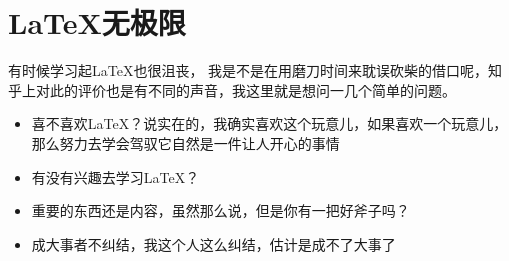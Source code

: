 \chapter{\LaTeX 无极限}

有时候学习起\LaTeX 也很沮丧， 我是不是在用磨刀时间来耽误砍柴的借口呢，知乎上对此的评价也是有不同的声音，我这里就是想问一几个简单的问题。
\begin{itemize}
\item 喜不喜欢\LaTeX ？说实在的，我确实喜欢这个玩意儿，如果喜欢一个玩意儿，那么努力去学会驾驭它自然是一件让人开心的事情
\item 有没有兴趣去学习\LaTeX ？
\item 重要的东西还是内容，虽然那么说，但是你有一把好斧子吗？
\item 成大事者不纠结，我这个人这么纠结，估计是成不了大事了
\end{itemize}